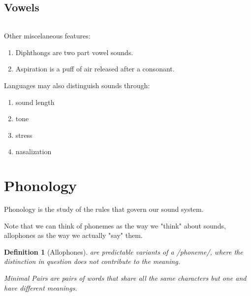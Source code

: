 \documentclass[12pt]{article}
\newtheorem{dfn}{Definition}
\begin{document}
\subsection{Vowels}

\begin{tabular}{|c|}

\end{tabular}

Other miscelaneous features:
\begin{enumerate}
\item Diphthongs are two part vowel sounds.
\item Aspiration is a puff of air released after a consonant.
\end{enumerate}

Languages may also distinguish sounds through:
\begin{enumerate}
\item sound length
\item tone
\item stress
\item nasalization
\end{enumerate}

\section{Phonology}

Phonology is the study of the rules that govern our sound system.

Note that we can think of phonemes as the way we "think" about sounds, allophones as the way we actually "say" them.

\begin{dfn}
[Allophones] are predictable variants of a /phoneme/, where the distinction in question does not contribute to the meaning.

Minimal Pairs are pairs of words that share all the same characters but one and have different meanings.

\medskip


\end{dfn}
\end{document}
